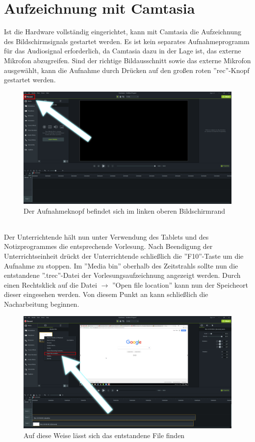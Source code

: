\documentclass{scrreprt}
\begin{document}
\section{Aufzeichnung mit Camtasia}
Ist die Hardware vollständig eingerichtet, kann mit Camtasia die Aufzeichnung des Bildschirmsignals gestartet werden. Es ist kein separates Aufnahmeprogramm für das Audiosignal erforderlich, da Camtasia dazu in der Lage ist, das externe Mikrofon abzugreifen. Sind der richtige Bildausschnitt sowie das externe Mikrofon ausgewählt, kann die Aufnahme durch Drücken auf den großen roten ''rec''-Knopf gestartet werden.
\\
\begin{figure}[h]
    \centering
    \includegraphics[width=1\textwidth]{record.png}
    \caption{Der Aufnahmeknopf befindet sich im linken oberen Bildschirmrand}
    \label{fig:record}
\end{figure}
\\
Der Unterrichtende hält nun unter Verwendung des Tablets und des Notizprogrammes die entsprechende Vorlesung. Nach Beendigung der Unterrichtseinheit drückt der Unterrichtende schließlich die ''F10''-Taste um die Aufnahme zu stoppen. Im ''Media bin'' oberhalb des Zeitstrahls sollte nun die entstandene ''.trec''-Datei der Vorlesungsaufzeichnung angezeigt werden. Durch einen Rechtsklick auf die Datei $\rightarrow$ ''Open file location'' kann nun der Speicheort dieser eingesehen werden. Von diesem Punkt an kann schließlich die Nacharbeitung beginnen.
\pagebreak
\begin{figure}[h]
    \centering
    \includegraphics[width=1\textwidth]{filelocation}
    \caption{Auf diese Weise lässt sich das entstandene File finden}
    \label{fig:filelocation}
\end{figure}
\end{document}
